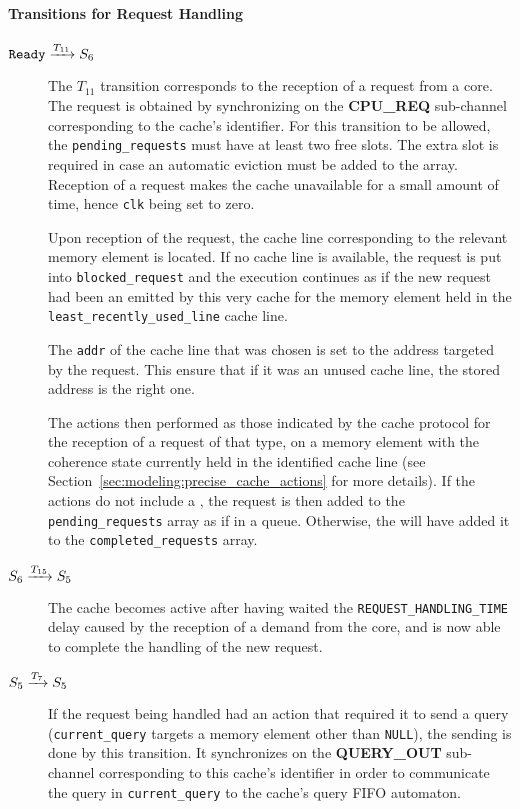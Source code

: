 \paragraph{Transitions for Request Handling}
\begin{description}
\item[$\texttt{Ready} \xrightarrow[]{T_{11}} S_6$] The $T_{11}$
   transition corresponds to the reception of a request from a core. The request
   is obtained by synchronizing on the \textbf{CPU\_REQ} sub-channel
   corresponding to the cache's identifier. For this transition to be allowed,
   the \lstinline!pending_requests! must have at least two free slots. The extra
   slot is required in case an automatic eviction must be added to the array.
   Reception of a request makes the cache unavailable for a small amount of
   time, hence \lstinline!clk! being set to zero.

   Upon reception of the request, the cache line corresponding to the relevant
   memory element is located. If no cache line is available, the request is put
   into \lstinline!blocked_request! and the execution continues as if the new
   request had been an \evictinstr{} emitted by this very cache for the memory
   element held in the \lstinline!least_recently_used_line! cache line.

   The \lstinline!addr! of the cache line that was chosen is set to the address
   targeted by the request. This ensure that if it was an unused cache line, the
   stored address is the right one.

   The actions then performed as those indicated by the cache protocol for the
   reception of a request of that type, on a memory element with the coherence
   state currently held in the identified cache line (see
   Section~\ref{sec:modeling:precise_cache_actions} for more details). If the
   actions do not include a \hitact{}, the request is then added to the
   \lstinline!pending_requests! array as if in a queue. Otherwise, the \hitact{}
   will have added it to the \lstinline!completed_requests! array.

\item[$S_6 \xrightarrow[]{T_{15}} S_5$]
   The cache becomes active after having waited the
   \lstinline!REQUEST_HANDLING_TIME! delay caused by the reception of a demand
   from the core, and is now able to complete the handling of the new request.

\item[$S_5 \xrightarrow[]{T_{7}} S_5$]
   If the request being handled had an action that required it to send a query
   (\lstinline!current_query! targets a memory element other than
   \lstinline!NULL!), the sending is done by this transition. It synchronizes on
   the \textbf{QUERY\_OUT} sub-channel corresponding to this cache's identifier
   in order to communicate the query in \lstinline!current_query! to the cache's
   query FIFO automaton.


\end{description}
